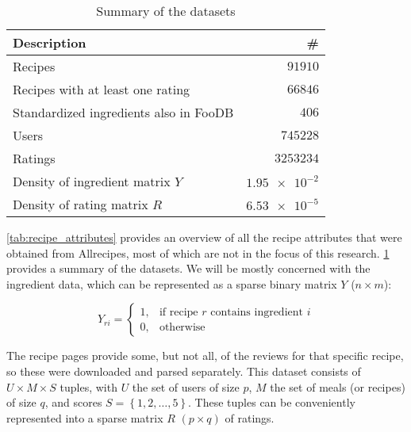 \begin{table}
	\caption{Summary of the datasets}
	\label{tab:dataset_summary}
	
	\centering
	\begin{tabular}{l r}
		\toprule
		\textbf{Description} & \textbf{\#} \\
		\midrule
		Recipes & $\num{91910}$ \\
		Recipes with at least one rating & $\num{66846}$ \\
		Standardized ingredients also in FooDB & $\num{406}$ \\
		Users & $\num{745228}$ \\
		Ratings & $\num{3253234}$ \\ 
		Density of ingredient matrix $Y$ & $\num{1.95e-2}$ \\
		Density of rating matrix $R$ & $\num{6.53e-5}$ \\
		\bottomrule
	\end{tabular}
\end{table}


\cref{tab:recipe_attributes} provides an overview of all the recipe attributes that were obtained from Allrecipes, most of which are not in the focus of this research.
\cref{tab:dataset_summary} provides a summary of the datasets.
We will be mostly concerned with the ingredient data, which can be represented as a sparse binary matrix $Y$ ($n \times m$):

\begin{equation*}
	\tag{Ingredient matrix}
	Y_{ri}=
	\begin{cases}
	    1,& \text{if recipe } r \text{ contains ingredient } i \\
	    0,& \text{otherwise}
	\end{cases}
\end{equation*}

The recipe pages provide some, but not all, of the reviews for that specific recipe, so these were downloaded and parsed separately.
This dataset consists of $U \times M \times S$ tuples, with $U$ the set of users of size $p$, $M$ the set of meals (or recipes) of size $q$, and scores $S=\left\{1, 2, \dots, 5\right\}$.
These tuples can be conveniently represented into a sparse matrix $R$ $(p \times q)$ of ratings.